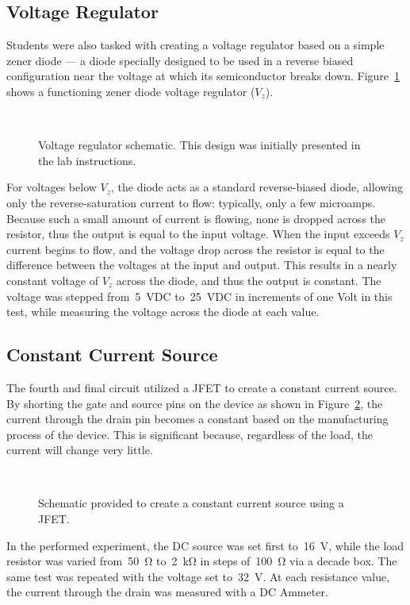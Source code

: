 \subsection{Voltage Regulator}
Students were also tasked with creating a voltage regulator based on a simple
zener diode --- a diode specially designed to be used in a reverse biased
configuration near the voltage at which its semiconductor breaks down.
Figure~\ref{fig:schem3} shows a functioning zener diode voltage regulator ($V_z$).
%
\begin{figure}[H]
	\centering
	\\
	\parbox{3.5in}{
	\caption{Voltage regulator schematic.  This design was initially presented
	in the lab instructions.}
	\label{fig:schem3}}
\end{figure}
%
For voltages below $V_z$, the diode acts as a standard reverse-biased diode,
allowing only the reverse-saturation current to flow: typically, only a few
microamps.  Because such a small amount of current is flowing, none is dropped
across the resistor, thus the output is equal to the input voltage.  When the
input exceeds $V_z$ current begins to flow, and the voltage drop across the
resistor is equal to the difference between the voltages at the input and
output.  This results in a nearly constant voltage of $V_z$ across the diode,
and thus the output is constant.  The voltage was stepped from~\SI{5}{\volt}DC
to~\SI{25}{\volt}{DC} in increments of one Volt in this test, while measuring
the voltage across the diode at each value.

\subsection{Constant Current Source}
The fourth and final circuit utilized a JFET to create a constant current
source.  By shorting the gate and source pins on the device as shown in
Figure~\ref{fig:schem4}, the current through the drain pin becomes a constant
based on the manufacturing process of the device.  This is significant because,
regardless of the load, the current will change very little.
%
\begin{figure}[H]
	\centering
	\\
	\parbox{3.5in}{
	\caption{Schematic provided to create a constant current source using a JFET.}
	\label{fig:schem4}}
\end{figure}
%
In the performed experiment, the DC source was set first to~\SI{16}{\volt},
while the load resistor was varied from~\SI{50}{\ohm} to~\SI{2}{\kilo\ohm} in
steps of~\SI{100}{\ohm} via a decade box.  The same test was repeated with the
voltage set to~\SI{32}{\volt}.  At each resistance value, the current through
the drain was measured with a DC Ammeter.
